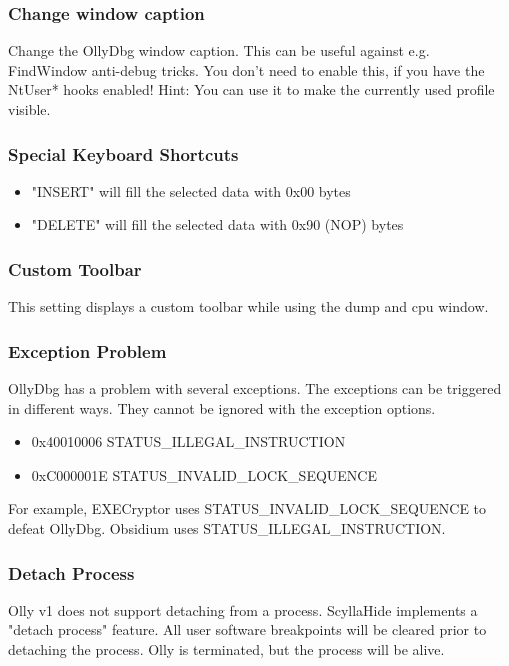 \documentclass[10pt,a4paper]{article}
\begin{document}
\subsubsection{Change window caption}
Change the OllyDbg window caption. This can be useful against e.g. FindWindow anti-debug tricks. You don't need to enable this, if you have the NtUser* hooks enabled! Hint: You can use it to make the currently used profile visible.

\subsubsection{Special Keyboard Shortcuts}

\begin{itemize}
\item "INSERT" will fill the selected data with 0x00 bytes
\item "DELETE" will fill the selected data with 0x90 (NOP) bytes
\end{itemize}

\subsubsection{Custom Toolbar}
This setting displays a custom toolbar while using the dump and cpu window.


\subsubsection{Exception Problem}
OllyDbg has a problem with several exceptions. The exceptions can be triggered in different ways. They cannot be ignored with the exception options.

\begin{itemize}
\item 0x40010006 STATUS\_ILLEGAL\_INSTRUCTION
\item 0xC000001E STATUS\_INVALID\_LOCK\_SEQUENCE
\end{itemize}

For example, EXECryptor uses STATUS\_INVALID\_LOCK\_SEQUENCE to defeat OllyDbg. Obsidium uses STATUS\_ILLEGAL\_INSTRUCTION.

\subsubsection{Detach Process}
Olly v1 does not support detaching from a process. ScyllaHide implements a "detach process" feature. All user software breakpoints will be cleared prior to detaching the process. Olly is terminated, but the process will be alive.
\end{document}
